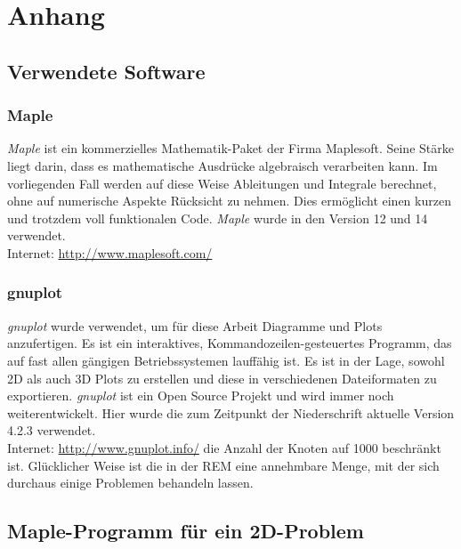 \chapter{Anhang}
\label{cha:anhang}

\section{Verwendete Software}
\label{cha:software}

\subsection{Maple\texttrademark}
\label{app:maple}
\emph{Maple\texttrademark} ist ein kommerzielles Mathematik-Paket der Firma Maplesoft. Seine Stärke liegt darin, dass es mathematische Ausdrücke algebraisch verarbeiten kann. Im vorliegenden Fall werden auf diese Weise Ableitungen und Integrale berechnet, ohne auf numerische Aspekte Rücksicht zu nehmen. Dies ermöglicht einen kurzen und trotzdem voll funktionalen Code. \emph{Maple\texttrademark} wurde in den Version 12 und 14 verwendet.\\
Internet: \url{http://www.maplesoft.com/}

\subsection{gnuplot}
\emph{gnuplot} wurde verwendet, um für diese Arbeit Diagramme und Plots anzufertigen. Es ist ein interaktives, Kommandozeilen-gesteuertes Programm, das auf fast allen gängigen Betriebssystemen lauffähig ist. Es ist in der Lage, sowohl 2D als auch 3D Plots zu erstellen und diese in verschiedenen Dateiformaten zu exportieren. \emph{gnuplot} ist ein Open Source Projekt und wird immer noch weiterentwickelt. Hier wurde die zum Zeitpunkt der Niederschrift aktuelle Version 4.2.3 verwendet.\\
Internet: \url{http://www.gnuplot.info/}
die Anzahl der Knoten auf 1000 beschränkt ist. Glücklicher Weise ist die in der REM eine annehmbare Menge, mit der sich durchaus einige Problemen behandeln lassen.

\clearpage

\section{Maple\texttrademark -Programm für ein 2D-Problem}
\label{sec:maplecode}

%
  

